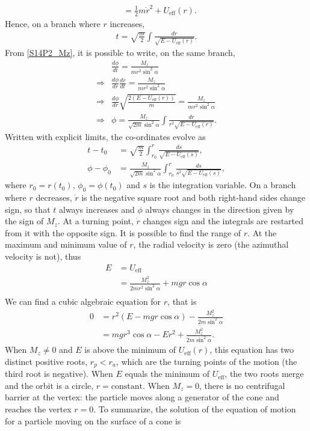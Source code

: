 \begin{problem}[title={Particle on the surface of a vertical cone}]
{\begin{align*}
    &= \frac{1}{2}m\Dot{r}^2 + U_{\text{eff}}(r).
\end{align*}
Hence, on a branch where $r$ increases,
\begin{align*}
    t = \sqrt{\frac{m}{2}} \int \frac{dr}{\sqrt{E-U_{\text{eff}}(r)}}.
\end{align*}
From \eqref{S14P2_Mz}, it is possible to write, on the same branch,
\begin{align*}
    &\frac{d\phi}{dt} = \frac{M_z}{mr^2\sin^2{\alpha}} \\
    \Rightarrow &\frac{d\phi}{dr}\frac{dr}{dt} = \frac{M_z}{mr^2\sin^2{\alpha}} \\
    \Rightarrow &\frac{d\phi}{dr} \sqrt{\frac{2\left(E-U_{\text{eff}}(r)\right)}{m}} = \frac{M_z}{mr^2\sin^2{\alpha}} \\
    \Rightarrow &\phi =\frac{M_z}{\sqrt{2m}\sin^2{\alpha}} \int \frac{dr}{r^2\sqrt{E-U_{\text{eff}}(r)}}.
\end{align*}
Written with explicit limits, the co-ordinates evolve as
\begin{align*}
    t - t_0 &= \sqrt{\frac{m}{2}} \int_{r_0}^{r} \frac{ds}{\sqrt{E-U_{\text{eff}}(s)}}, \\
    \phi - \phi_0 &=\frac{M_z}{\sqrt{2m}\sin^2{\alpha}} \int_{r_0}^{r} \frac{ds}{s^2\sqrt{E-U_{\text{eff}}(s)}},
\end{align*}
where $r_0 = r(t_0)$, $\phi_0 = \phi(t_0)$ and $s$ is the integration variable. On a branch where $r$ decreases, $\Dot{r}$ is the negative square root and both right-hand sides change sign, so that $t$ always increases and $\phi$ always changes in the direction given by the sign of $M_z$. At a turning point, $\Dot{r}$ changes sign and the integrals are restarted from it with the opposite sign. It is possible to find the range of $r$. At the maximum and minimum value of $r$, the radial velocity is zero (the azimuthal velocity is not), thus
\begin{align*}
    E &= U_{\text{eff}} \\
    &= \frac{M_z^2}{2mr^2\sin^2{\alpha}} + mgr\cos{\alpha} \\
\end{align*}
We can find a cubic algebraic equation for $r$, that is
\begin{align*}
    0 &= r^2\left( E - mgr\cos{\alpha} \right) - \frac{M_z^2}{2m\sin^2{\alpha}} \\
    &= mgr^3\cos{\alpha} - Er^2 + \frac{M_z^2}{2m\sin^2{\alpha}}.
\end{align*}
When $M_z \neq 0$ and $E$ is above the minimum of $U_{\text{eff}}(r)$, this equation has two distinct positive roots, $r_p < r_a$, which are the turning points of the motion (the third root is negative). When $E$ equals the minimum of $U_{\text{eff}}$, the two roots merge and the orbit is a circle, $r = \text{constant}$. When $M_z = 0$, there is no centrifugal barrier at the vertex: the particle moves along a generator of the cone and reaches the vertex $r=0$. To summarize, the solution of the equation of motion for a particle moving on the surface of a cone is
}
\end{problem}
